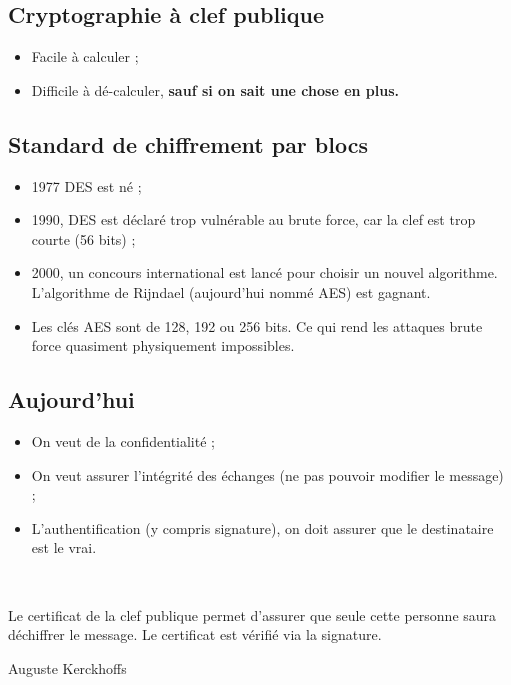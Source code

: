 \subsection{Cryptographie à clef publique}
    \begin{itemize}
        \item Facile à calculer ;
        \item Difficile à dé-calculer, \textbf{sauf si on sait une chose en plus.}
    \end{itemize}
    
\subsection{Standard de chiffrement par blocs}
    \begin{itemize}
        \item 1977 DES est né ;
        \item 1990, DES est déclaré trop vulnérable au brute force,
            car la clef est trop courte (56 bits) ;
        \item 2000, un concours international est lancé pour choisir un nouvel
            algorithme. L'algorithme de Rijndael (aujourd'hui nommé AES) est gagnant.
        \item Les clés AES sont de 128, 192 ou 256 bits. Ce qui rend les attaques
            brute force quasiment physiquement impossibles.
    \end{itemize}
    
\subsection{Aujourd'hui}
    \begin{itemize}
        \item On veut de la confidentialité ;
        \item On veut assurer l'intégrité des échanges 
            (ne pas pouvoir modifier le message) ;
        \item L'authentification (y compris signature),
            on doit assurer que le destinataire est le vrai.
    \end{itemize}
    
    ~
    
    Le certificat de la clef publique permet d'assurer que seule cette
    personne saura déchiffrer le message. Le certificat est vérifié via
    la signature.
    
\vspace*{\fill}
\begin{thebibliography}{1}
    Auguste Kerckhoffs
\end{thebibliography}
